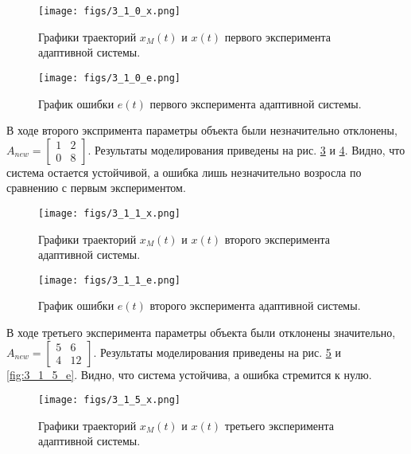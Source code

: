\documentclass{article}
\begin{document}
\begin{figure}[h!]
  \centering
  \texttt{[image: figs/3\_1\_0\_x.png]}
  \caption{Графики траекторий $x_M(t)$ и $x(t)$ первого эксперимента адаптивной системы.} 
  \label{fig:3_1_0_x}
\end{figure}

\begin{figure}[h!]
  \centering
  \texttt{[image: figs/3\_1\_0\_e.png]}
  \caption{График ошибки $e(t)$ первого эксперимента адаптивной системы.} 
  \label{fig:3_1_0_e}
\end{figure}
\FloatBarrier

В ходе второго экспримента параметры объекта были незначительно отклонены, $A_{new} =\begin{bmatrix} 1 & 2 \\ 0 & 8\end{bmatrix}$. Результаты моделирования приведены на рис. \ref{fig:3_1_1_x} и \ref{fig:3_1_1_e}. Видно, что система остается устойчивой, а ошибка лишь незначительно возросла по сравнению с первым экспериментом.

\begin{figure}[h!]
  \centering
  \texttt{[image: figs/3\_1\_1\_x.png]}
  \caption{Графики траекторий $x_M(t)$ и $x(t)$ второго эксперимента адаптивной системы.} 
  \label{fig:3_1_1_x}
\end{figure}

\begin{figure}[h!]
  \centering
  \texttt{[image: figs/3\_1\_1\_e.png]}
  \caption{График ошибки $e(t)$ второго эксперимента адаптивной системы.} 
  \label{fig:3_1_1_e}
\end{figure}
\FloatBarrier

В ходе третьего эксперимента параметры объекта были отклонены значительно, $A_{new} =\begin{bmatrix} 5 & 6 \\ 4 & 12\end{bmatrix}$. Результаты моделирования приведены на рис. \ref{fig:3_1_5_x} и \ref{fig:3_1_5_e}. Видно, что система устойчива, а ошибка стремится к нулю.

\begin{figure}[h!]
  \centering
  \texttt{[image: figs/3\_1\_5\_x.png]}
  \caption{Графики траекторий $x_M(t)$ и $x(t)$ третьего эксперимента адаптивной системы.} 
  \label{fig:3_1_5_x}
\end{figure}
\end{document}
